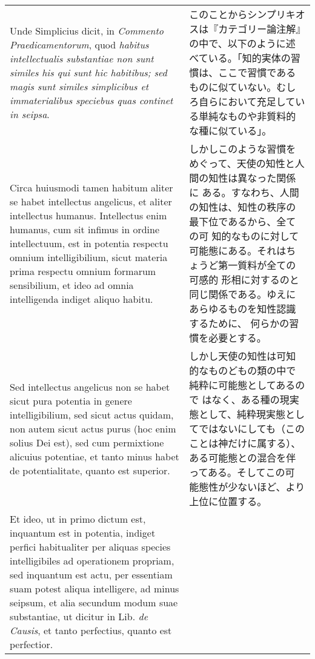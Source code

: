 \documentclass[10pt]{jsarticle} %
\begin{document}
\begin{longtable}{p{21em}p{21em}}
\\


Unde Simplicius dicit, in {\itshape Commento Praedicamentorum}, quod
 {\itshape habitus intellectualis substantiae non sunt similes his qui
 sunt hic habitibus; sed magis sunt similes simplicibus et
 immaterialibus speciebus quas continet in seipsa}.


&

このことからシンプリキオスは『カテゴリー論注解』の中で、以下のように述
 べている。「知的実体の習慣は、ここで習慣であるものに似ていない。むし
 ろ自らにおいて充足している単純なものや非質料的な種に似ている」。

\\


Circa huiusmodi tamen habitum aliter se habet intellectus angelicus,
et aliter intellectus humanus. Intellectus enim humanus, cum sit
infimus in ordine intellectuum, est in potentia respectu omnium
intelligibilium, sicut materia prima respectu omnium formarum
sensibilium, et ideo ad omnia intelligenda indiget aliquo habitu.


&

しかしこのような習慣をめぐって、天使の知性と人間の知性は異なった関係に
 ある。すなわち、人間の知性は、知性の秩序の最下位であるから、全ての可
 知的なものに対して可能態にある。それはちょうど第一質料が全ての可感的
 形相に対するのと同じ関係である。ゆえにあらゆるものを知性認識するために、
 何らかの習慣を必要とする。

\\


Sed intellectus angelicus non se habet sicut pura potentia in genere
intelligibilium, sed sicut actus quidam, non autem sicut actus purus
(hoc enim solius Dei est), sed cum permixtione alicuius potentiae, et
tanto minus habet de potentialitate, quanto est superior.

&

しかし天使の知性は可知的なものどもの類の中で純粋に可能態としてあるので
 はなく、ある種の現実態として、純粋現実態としてではないにしても（この
 ことは神だけに属する）、ある可能態との混合を伴ってある。そしてこの可
 能態性が少ないほど、より上位に位置する。

\\


Et ideo, ut in primo dictum est, inquantum est in potentia, indiget
perfici habitualiter per aliquas species intelligibiles ad operationem
propriam, sed inquantum est actu, per essentiam suam potest aliqua
intelligere, ad minus seipsum, et alia secundum modum suae
substantiae, ut dicitur in Lib. {\itshape de Causis}, et tanto perfectius, quanto
est perfectior.



\end{longtable}
\end{document}
